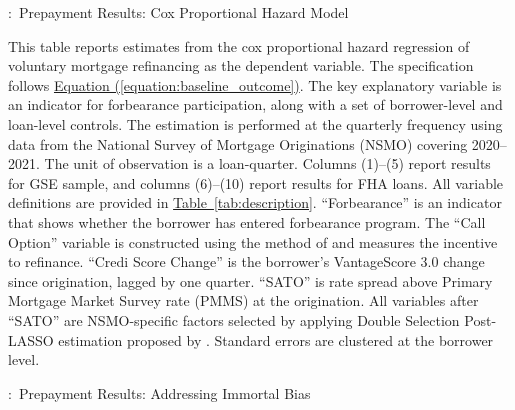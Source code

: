 \documentclass[11pt]{article}
\begin{document}
{\begin{table}[htbp]
\vspace{1em}



\end{table}
\FloatBarrier
\clearpage




\begin{table}[htbp]
\captionsetup{justification=justified,singlelinecheck=false}
\footnotesize
\caption{:\ Prepayment Results: Cox Proportional Hazard Model}
\label{tab:cox_prepayment}

\vspace{0.5em}

\begin{minipage}{\textwidth}
\small
This table reports estimates from the cox proportional hazard regression of voluntary mortgage refinancing as the dependent variable. The specification follows \hyperref[equation:baseline_outcome]{Equation (\ref*{equation:baseline_outcome})}. The key explanatory variable is an indicator for forbearance participation, along with a set of borrower-level and loan-level controls. The estimation is performed at the quarterly frequency using data from the National Survey of Mortgage Originations (NSMO) covering 2020–2021. The unit of observation is a loan-quarter. Columns (1)–(5) report results for GSE sample, and columns (6)–(10) report results for FHA loans. All variable definitions are provided in \hyperref[tab:description]{Table~\ref*{tab:description}}. ``Forbearance'' is an indicator that shows whether the borrower has entered forbearance program. The ``Call Option'' variable is constructed using the method of \citet{deng2000mortgage} and measures the incentive to refinance. ``Credi Score Change'' is the borrower’s VantageScore 3.0 change since origination, lagged by one quarter. ``SATO'' is rate spread above Primary Mortgage Market Survey rate (PMMS) at the origination. All variables after ``SATO'' are NSMO-specific factors selected by applying Double Selection Post-LASSO estimation proposed by \citet{belloni2014inference}.  Standard errors are clustered at the borrower level. 
\end{minipage}

\vspace{1em}



\end{table}
\FloatBarrier
\clearpage




\begin{table}[htbp]
\captionsetup{justification=justified,singlelinecheck=false}
\footnotesize
\caption{:\ Prepayment Results: Addressing Immortal Bias}
\label{tab:immortal}
\vspace{0.5em}


\end{table}}
\end{document}

